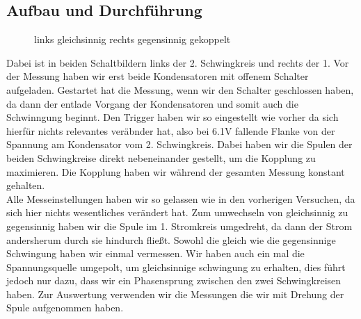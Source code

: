 \documentclass[twoside]{protokoll}
\begin{document}
\subsection{Aufbau und Durchführung}
\begin{figure}[H]
    \centering
    \hfill
    \caption{links gleichsinnig rechts gegensinnig gekoppelt}
\end{figure}
Dabei ist in beiden Schaltbildern links der 2. Schwingkreis und rechts der 1.
Vor der Messung haben wir erst beide Kondensatoren mit offenem Schalter aufgeladen.
Gestartet hat die Messung, wenn wir den Schalter geschlossen haben, da dann der entlade Vorgang der Kondensatoren und somit auch die Schwinngung beginnt.
Den Trigger haben wir so eingestellt wie vorher da sich hierfür nichts relevantes veräbnder hat, also bei 6.1V fallende Flanke von der Spannung am Kondensator vom 2. Schwingkreis.
Dabei haben wir die Spulen der beiden Schwingkreise direkt nebeneinander gestellt, um die Kopplung zu maximieren.
Die Kopplung haben wir während der gesamten Messung konstant gehalten.\\

Alle Messeinstellungen haben wir so gelassen wie in den vorherigen Versuchen, da sich hier nichts wesentliches verändert hat.
Zum umwechseln von gleichsinnig zu gegensinnig haben wir die Spule im 1. Stromkreis umgedreht, da dann der Strom andersherum durch sie hindurch fließt.
Sowohl die gleich wie die gegensinnige Schwingung haben wir einmal vermessen.
Wir haben auch ein mal die Spannungsquelle umgepolt, um gleichsinnige schwingung zu erhalten, dies führt jedoch nur dazu, dass wir ein Phasensprung zwischen den zwei Schwingkreisen haben. 
Zur Auswertung verwenden wir die Messungen die wir mit Drehung der Spule aufgenommen haben.
\end{document}
